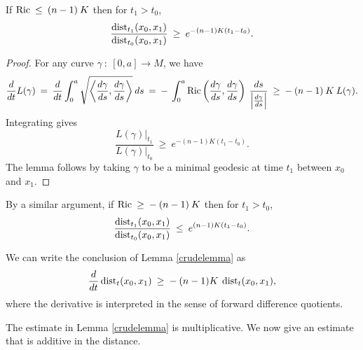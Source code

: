 \begin{lemma}
  \label{lem:kl-length-distortion-estimates-length-distortion-estimates-lemma}
 \label{crudelemma}
If $\operatorname{Ric} \: \le \: (n-1) \: K$ then for $t_1 > t_0$,
\begin{equation}
\frac{\operatorname{dist}_{t_1}(x_0, x_1)}{\operatorname{dist}_{t_0}(x_0, x_1)} \: \ge \:
e^{-(n-1)K(t_1-t_0)}.
\end{equation}
\end{lemma}
\begin{proof}
For any curve $\gamma \: : \: [0,a] \rightarrow M$, we have
\begin{equation}
\frac{d}{dt} L(\gamma) \: =\:
\frac{d}{dt} \int_0^a
\sqrt{ \left\langle \frac{d\gamma}{ds}, \frac{d\gamma}{ds}
\right\rangle} \: ds \: = \:
- \: \int_0^a \operatorname{Ric} \left( \frac{d\gamma}{ds}, \frac{d\gamma}{ds}
\right) \: \frac{ds}{\left| \frac{d\gamma}{ds} \right|} \: \ge \:
- \: (n-1) \: K \: L(\gamma).
\end{equation}
Integrating gives
\begin{equation}
\frac{L(\gamma) \big|_{t_1}}{L(\gamma) \big|_{t_0}} \: \ge \:
e^{-(n-1)K(t_1-t_0)}.
\end{equation}
The lemma follows by taking
$\gamma$ to be a minimal geodesic at time $t_1$ between
$x_0$ and $x_1$.
\end{proof}

\begin{remark}
  \label{rem:kl-length-distortion-estimates-structural-remark-length-distortion-estimates}
 \label{similar}
By a similar argument, if
$\operatorname{Ric} \: \ge \: - \: (n-1) \: K$ then for $t_1 > t_0$,
\begin{equation}
\frac{\operatorname{dist}_{t_1}(x_0, x_1)}{\operatorname{dist}_{t_0}(x_0, x_1)} \: \le \:
e^{(n-1)K(t_1-t_0)}.
\end{equation}
\end{remark}

We can write the conclusion of Lemma \ref{crudelemma} as
\begin{equation} \label{conclusion}
\frac{d}{dt} \operatorname{dist}_t(x_0, x_1) \: \ge \: - \: (n-1) K \:
\operatorname{dist}_t(x_0, x_1),
\end{equation}
where the derivative is interpreted in the sense of forward difference quotients.

The estimate in Lemma \ref{crudelemma} is multiplicative.
We now give an estimate that is additive in the distance.

